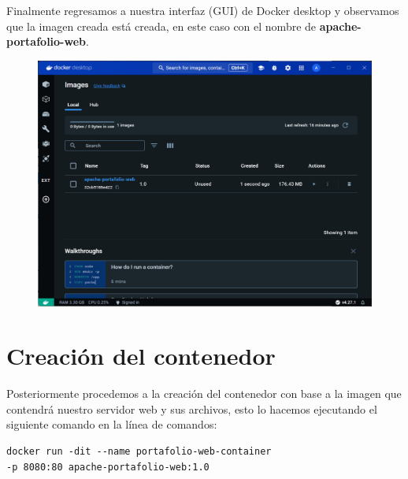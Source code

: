 \documentclass[12pt,a4paper]{article}
\begin{document}
Finalmente regresamos a nuestra interfaz (GUI) de Docker desktop y observamos que la imagen creada está creada, en este caso con el nombre de \textbf{apache-portafolio-web}.

\begin{figure}[H]
    \centering
    \includegraphics[width=1\linewidth]{M3_Virtualización_y_Contenedores/Tarea_3_Creación_Contenedor_Docker/reporte/figuras/3-2_Preparación_del_Contenedor.png}
    \label{fig:Preparación_Contenedor_2}
\end{figure}


\section{Creación del contenedor}

Posteriormente procedemos a la creación del contenedor con base a la imagen que contendrá nuestro servidor web y sus archivos, esto lo hacemos ejecutando el siguiente comando en la línea de comandos:

\begin{lstlisting}[]
docker run -dit --name portafolio-web-container 
-p 8080:80 apache-portafolio-web:1.0
\end{lstlisting}
\end{document}
